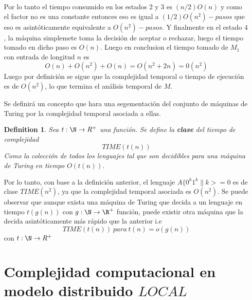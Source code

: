 \documentclass[10pt]{report}
\newtheorem{definition}{Definition}
\begin{document}
    Por lo tanto el tiempo consumido en los estados 2 y 3 es $(n/2)O(n)$ y como el factor no es una constante entonces eso
    es igual a $(1/2)O(n^{2})-pasos$ que eso es asintóticamente equivalente a $O(n^{2})-pasos$.
    Y finalmente en el estado $4$, la máquina simplemete toma la decisión de aceptar o rechazar,
    luego el tiempo tomado en dicho paso es $O(n)$.
    \newline
    Luego en conclusion el tiempo tomado de $M_{1}$ con entrada de longitud $n$ es
    \begin{equation}
        O(n) + O(n^{2}) + O(n) = O(n^{2}+2n) = 0(n^{2})\label{eq:equation10}
    \end{equation}
    Luego por definición se sigue que la complejidad temporal o tiempo de ejecución es de $O(n^{2})$,
    lo que termina el análisis temporal de $M$.\newline

    Se definirá un concepto que hara una segementación del conjunto de máquinas de Turing por la complejidad temporal
    asociada a ellas.
    \begin{definition}
       Sea $t:\N\rightarrow R^{+}$ una función.\newline
        Se define la \textbf{clase} del tiempo de complejidad
        \begin{equation}
            TIME(t(n))\label{eq:equation11}
        \end{equation}
        Como la colección de todos los lenguajes tal que son decidibles para una máquina
        de Turing en tiempo $O(t(n))$.
    \end{definition}
    Por lo tanto, con base a la definición anterior, el lenguaje $A\{0^{k}1^{k}\| k>=0$ es de clase $TIME(n^{2})$,
    ya que la complejidad temporal asociada es $O(n^{2})$.\newline
    Se puede observar que aunque exista una máquina de Turing que decida a un lenguaje en tiempo $t(g(n))$ con
    $g:\N\rightarrow \R^{+}$ función, puede existir otra máquina que la decida asintóticamente más rápido que la anterior
    i.e
    \begin{equation}
        TIME(t(n)) \ para \ t(n)=o(g(n))\label{eq:equation9}
    \end{equation}
    con $t:\N\rightarrow R^{+}$

    \section{Complejidad computacional en modelo distribuido $LOCAL$}\label{sec:complejidad-computacional-en-modelo-distribuido-$local$}
\end{document}
